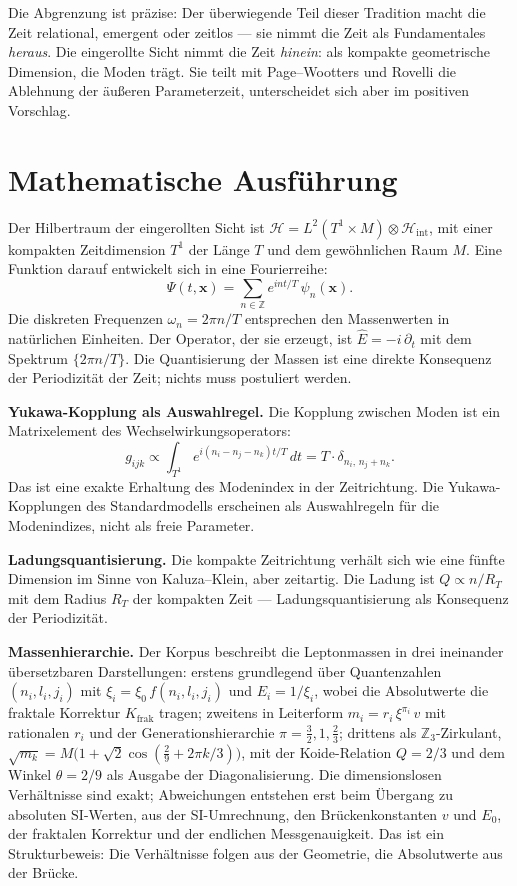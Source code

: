 Die Abgrenzung ist präzise: Der überwiegende Teil dieser Tradition
macht die Zeit relational, emergent oder zeitlos --- sie nimmt die Zeit
als Fundamentales \emph{heraus}. Die eingerollte Sicht nimmt die Zeit
\emph{hinein}: als kompakte geometrische Dimension, die Moden trägt.
Sie teilt mit Page--Wootters und Rovelli die Ablehnung der äußeren
Parameterzeit, unterscheidet sich aber im positiven Vorschlag.

\section{Mathematische Ausführung}

Der Hilbertraum der eingerollten Sicht ist
$\mathcal{H} = L^2(T^1\times M)\otimes\mathcal{H}_{\mathrm{int}}$, mit
einer kompakten Zeitdimension $T^1$ der Länge $T$ und dem gewöhnlichen
Raum $M$. Eine Funktion darauf entwickelt sich in eine Fourierreihe:
\begin{equation}
  \Psi(t,\mathbf{x}) = \sum_{n\in\mathbb{Z}}e^{i n t/T}\,\psi_n(\mathbf{x}).
\end{equation}
Die diskreten Frequenzen $\omega_n = 2\pi n/T$ entsprechen den
Massenwerten in natürlichen Einheiten. Der Operator, der sie erzeugt,
ist $\hat E = -i\,\partial_t$ mit dem Spektrum $\{2\pi n/T\}$. Die
Quantisierung der Massen ist eine direkte Konsequenz der Periodizität
der Zeit; nichts muss postuliert werden.

\textbf{Yukawa-Kopplung als Auswahlregel.} Die Kopplung zwischen Moden
ist ein Matrixelement des Wechselwirkungsoperators:
\begin{equation}
  g_{ijk}\propto\int_{T^1}e^{i(n_i-n_j-n_k)t/T}\,dt
  = T\cdot\delta_{n_i,\,n_j+n_k}.
\end{equation}
Das ist eine exakte Erhaltung des Modenindex in der Zeitrichtung. Die
Yukawa-Kopplungen des Standardmodells erscheinen als Auswahlregeln für
die Modenindizes, nicht als freie Parameter.

\textbf{Ladungsquantisierung.} Die kompakte Zeitrichtung verhält sich
wie eine fünfte Dimension im Sinne von Kaluza--Klein, aber zeitartig.
Die Ladung ist $Q\propto n/R_T$ mit dem Radius $R_T$ der kompakten Zeit
--- Ladungsquantisierung als Konsequenz der Periodizität.

\textbf{Massenhierarchie.} Der Korpus beschreibt die Leptonmassen in
drei ineinander übersetzbaren Darstellungen: erstens grundlegend über
Quantenzahlen $(n_i,l_i,j_i)$ mit $\xi_i = \xi_0\,f(n_i,l_i,j_i)$ und
$E_i = 1/\xi_i$, wobei die Absolutwerte die fraktale Korrektur
$K_{\mathrm{frak}}$ tragen; zweitens in Leiterform
$m_i = r_i\,\xi^{\pi_i}\,v$ mit rationalen $r_i$ und der
Generationshierarchie $\pi = \frac32, 1, \frac23$; drittens als
$\mathbb{Z}_3$-Zirkulant, $\sqrt{m_k} = M\bigl(1+\sqrt2\cos(\frac29+2\pi k/3)\bigr)$,
mit der Koide-Relation $Q = 2/3$ und dem Winkel $\theta = 2/9$ als
Ausgabe der Diagonalisierung. Die dimensionslosen Verhältnisse sind
exakt; Abweichungen entstehen erst beim Übergang zu absoluten
SI-Werten, aus der SI-Umrechnung, den Brückenkonstanten $v$ und $E_0$,
der fraktalen Korrektur und der endlichen Messgenauigkeit. Das ist ein
Strukturbeweis: Die Verhältnisse folgen aus der Geometrie, die
Absolutwerte aus der Brücke.

